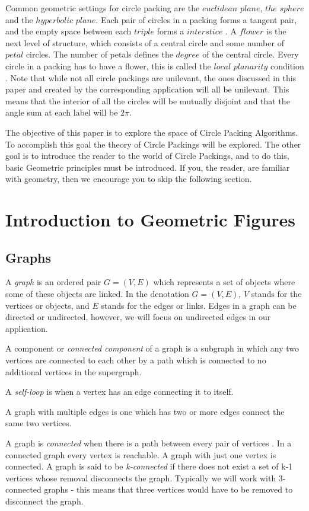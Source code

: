 \documentclass[11pt]{article}
\begin{document}
Common geometric settings for circle packing are the $euclidean$ $plane$, $the$ $sphere$ and the $hyperbolic$ $plane$. Each pair of circles in a packing forms a tangent pair, and the empty space between each $triple$ forms a $interstice$ \cite{stephenson05introduction}. A $flower$ is the next level of structure, which consists of a central circle and some number of $petal$ circles. The number of petals defines the $degree$ of the central circle. Every circle in a packing has to have a flower, this is called the $local$ $planarity$ condition \cite{stephenson05introduction}. Note that while not all circle packings are unilevant, the ones discussed in this paper and created by the corresponding application will all be unilevant. This means that the interior of all the circles will be mutually disjoint and that the angle sum at each label will be $2\pi$.

The objective of this paper is to explore the space of Circle Packing Algorithms. To accomplish this goal the theory of Circle Packings will be explored. The other goal is to introduce the reader to the world of Circle Packings, and to do this, basic Geometric principles must be introduced. If you, the reader, are familiar with geometry, then we encourage you to skip the following section.

\section{Introduction to Geometric Figures}
\subsection{Graphs}
A \emph{graph} is an ordered pair $G=(V,E)$ which represents a set of objects where some of these objects are linked. In the denotation $G=(V,E)$, $V$ stands for the vertices or objects, and $E$ stands for the edges or links. Edges in a graph can be directed or undirected, however, we will focus on undirected edges in our application.

  A component or \emph{connected component} of a graph is a subgraph in which any two vertices are connected to each other by a path which is connected to no additional vertices in the supergraph.

  A \emph{self-loop} is when a vertex has an edge connecting it to itself.
  
  A graph with multiple edges is one which has two or more edges connect the same two vertices.

  A graph is \emph{connected} when there is a path between every pair of vertices \cite{mathworld:ConnectedGraphs}. 
  In a connected graph every vertex is reachable. A graph with just one vertex is connected. A graph is said to be \emph{k-connected} if there does not exist a set of k-1 vertices whose removal disconnects the graph. Typically we will work with 3-connected graphs - this means that three vertices would have to be removed to disconnect the graph.
  
\end{document}
